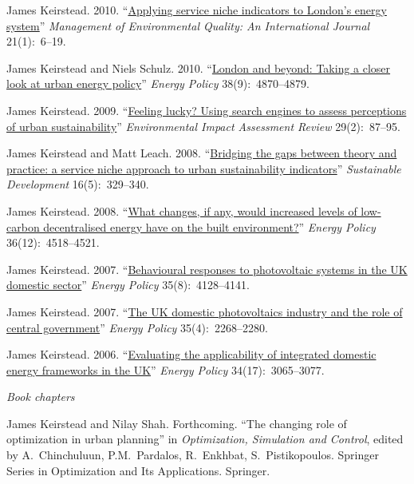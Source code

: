 \documentclass[11pt,a4paper]{article}
\begin{document}
\ind James Keirstead. 2010. ``\href{http://dx.doi.org/10.1108/14777831011010829}{Applying service niche indicators to London's energy system}'' \emph{Management of Environmental Quality: An International Journal} 21(1):~6--19.

\ind James Keirstead and Niels Schulz. 2010. ``\href{http://dx.doi.org/10.1016/j.enpol.2009.07.025}{London and beyond: Taking a closer look at urban energy policy}'' \emph{Energy Policy} 38(9):~4870--4879.

\ind James Keirstead. 2009. ``\href{http://dx.doi.org/10.1016/j.eiar.2008.09.001}{Feeling lucky? Using search engines to assess perceptions of urban sustainability}'' \emph{Environmental Impact Assessment Review} 29(2):~87--95.

\ind James Keirstead and Matt Leach.  2008. ``\href{http://dx.doi.org/10.1002/sd.349}{Bridging the gaps between theory and practice: a service niche approach to urban sustainability indicators}'' \emph{Sustainable Development} 16(5):~329--340.

\ind James Keirstead. 2008. ``\href{http://dx.doi.org/10.1016/j.enpol.2008.09.019}{What changes, if any, would increased levels of low-carbon decentralised energy have on the built environment?}'' \emph{Energy Policy} 36(12):~4518--4521.

\ind James Keirstead. 2007. ``\href{http://dx.doi.org/10.1016/j.enpol.2007.02.019}{Behavioural responses to photovoltaic systems in the UK domestic sector}'' \emph{Energy Policy} 35(8):~4128--4141.

\ind James Keirstead. 2007. ``\href{http://dx.doi.org/10.1016/j.enpol.2006.08.003}{The UK domestic photovoltaics industry and the role of central government}'' \emph{Energy Policy} 35(4):~2268--2280.

\ind James Keirstead. 2006. ``\href{http://dx.doi.org/10.1016/j.enpol.2005.06.004}{Evaluating the applicability of integrated domestic energy frameworks in the UK}'' \emph{Energy Policy} 34(17):~3065--3077.

\bigskip

\noindent\emph{Book chapters \vspace{0.01in}}


\ind James Keirstead and Nilay Shah. Forthcoming. ``The changing role of optimization in urban planning'' in \emph{Optimization, Simulation and Control}, edited by A.\ Chinchuluun, P.M.\ Pardalos, R.\ Enkhbat, S.\ Pistikopoulos.  Springer Series in Optimization and Its Applications.  Springer.
\end{document}
